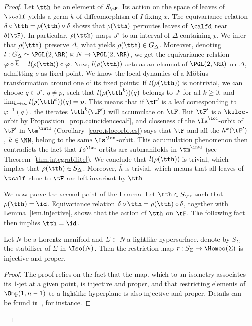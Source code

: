 \begin{proof}
Let $\tth$ be an element of $S_{\tF}$. Its action on the space of leaves of $\tcalf$ yields a germ $\overline{h}$ of diffeomorphism of $I$ fixing $x$. The equivariance relation $\delta \circ \tth=\rho(\tth) \circ \delta$ shows that $\rho(\tth)$ permutes leaves of $\calfd$ near $\delta(\tF)$. In particular, $\rho(\tth)$ maps $J'$ to an interval of $\Delta$ containing $p$. We infer that $\rho(\tth)$ preserve $\Delta$, what yields $\rho(\tth) \in G_{\Delta}$. Moreover, denoting $l : G_{\Delta}\simeq \PGL(2,\RR) \ltimes N \to \PGL(2,\RR)$, we get the equivariance relation $\varphi \circ \overline{h}=l(\rho(\tth)) \circ \varphi$. Now, $l(\rho(\tth))$ acts as an element of $\PGL(2,\RR)$ on $\Delta$, admitting $p$ as fixed point. We know the local dynamics of a Möbius transformation around one of its fixed points: If $l(\rho(\tth))$ is nontrivial, we can choose $q \in J'$, $q \not = p$, such that $l(\rho({\tth}^k))(q)$ belongs to $J'$ for all $k \geq 0$, and $\lim_{k \to \infty}l(\rho({\tth}^k))(q)=p$. This means that if $\tF'$ is a leaf corresponding to $\varphi^{-1}(q)$, the iterates ${\tth}^k(\tF')$ will accumulate on $\tF$. But $\tF'$ is a $\kiloc$-orbit by Proposition~\ref{prop.coincidencecalf}, and closeness of the $\Is^{\loc}$-orbit of $\tF'$ in $\tm^{\intl}$ (Corollary~\ref{coro.islocorbites}) says that $\tF$ and all the $h^k(\tF')$, $k \in \NN$, belong to the same $\Is^{\loc}$-orbit. This accumulation phenomenon then contradicts the fact that $\\Is^{\loc}$-orbits are submanifolds in $\tm^{\intl}$ (see Theorem~\ref{thm.integrabilite}). We conclude that $l(\rho(\tth))$ is trivial, which implies that $\rho(\tth) \in S_{\Delta}$. Moreover, $\overline{h}$ is trivial, which means that all leaves of $\tcalf$ close to $\tF$ are left invariant by $\tth$.

We now prove the second point of the Lemma. Let $\tth \in S_{\tF}$ such that $\rho(\tth)=\id$. Equivariance relation $\delta \circ \tth = \rho(\tth) \circ \delta$, together with Lemma~\ref{lem.injective}, shows that the action of $\tth$ on $\tF$. The following fact then implies $\tth=\id$.
\begin{fact}\label{fact.injectiveproper}
Let $N$ be a Lorentz manifold and $\Sigma \subset N$ a lightlike hypersurface. denote by $S_{\Sigma}$ the stabilizer of $\Sigma$ in $\Iso(N)$. Then the restriction map $r: S_{\Sigma}\to \Homeo(\Sigma)$ is injective and proper.
\end{fact}

\begin{proof}
The proof relies on the fact that the map, which to an isometry associates its $1$-jet at a given point, is injective and proper, and that restricting elements of $\Omp(1,n-1)$ to a lightlike hyperplane is also injective and proper. Details can be found in~\cite[Proposition~3.6]{zeghibflot}, for instance.
\end{proof}


\end{proof}
